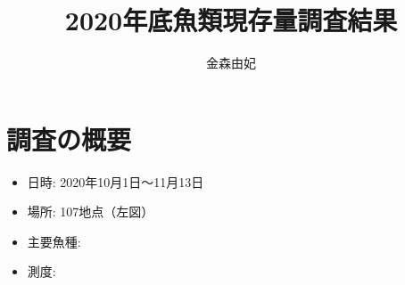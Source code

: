 



\title{2020年底魚類現存量調査結果}
\author{金森由妃}
\maketitle

\section{調査の概要}
\begin{itemize}
  \item 日時: 2020年10月1日〜11月13日
  \item 場所: 107地点（左図）
  \item 主要魚種: 
  \item 測度: 
\end{itemize}

